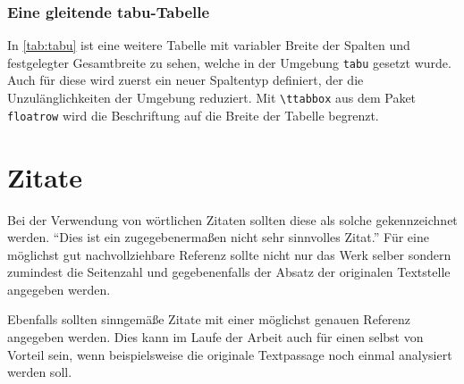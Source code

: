 \documentclass[english,ngerman]{tudscrreprt}
\begin{document}
\subsubsection{Eine gleitende tabu-Tabelle}
In \autoref{tab:tabu} ist eine weitere Tabelle mit variabler Breite der
Spalten und festgelegter Gesamtbreite zu sehen, welche in der Umgebung
\texttt{tabu} gesetzt wurde. Auch für diese wird zuerst ein neuer
Spaltentyp definiert, der die Unzulänglichkeiten der Umgebung reduziert.
Mit \texttt{\textbackslash ttabbox} aus dem Paket \texttt{floatrow} wird
die Beschriftung auf die Breite der Tabelle begrenzt.

\makeatletter
\newcolumntype{Z}{}
\renewcommand*{\NC@rewrite@Z}[1][]{%
  \NC@find>{\hspace{0pt}}X[#1]<{\@finalstrut\@arstrutbox}%
}
\makeatother

\begin{table}
\end{table}

\section{Zitate}
Bei der Verwendung von wörtlichen Zitaten sollten diese als solche
gekennzeichnet werden.
\enquote{Dies ist ein zugegebenermaßen nicht sehr sinnvolles Zitat.}
\cite[58]{hanisch14}
Für eine möglichst gut nachvollziehbare Referenz sollte nicht nur
das Werk selber sondern zumindest die Seitenzahl und gegebenenfalls
der Absatz der originalen Textstelle angegeben werden.
Ebenfalls sollten sinngemäße Zitate mit einer möglichst genauen Referenz
angegeben werden. Dies kann im Laufe der Arbeit auch für einen selbst von
Vorteil sein, wenn beispielsweise die originale Textpassage noch einmal
analysiert werden soll.

\printbibliography[heading=bibintoc]\label{sec:bibliography}%
\end{document}
